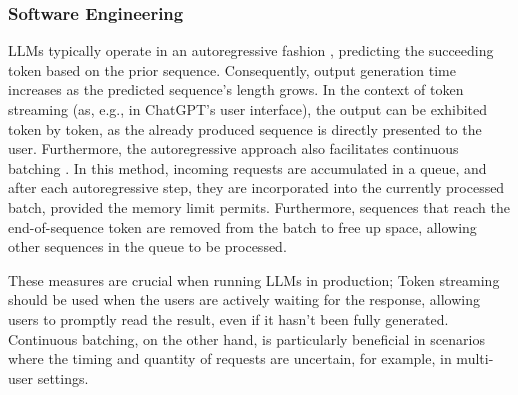 \documentclass[conference]{IEEEtran}
\begin{document}
\subsubsection{Software Engineering}
LLMs typically operate in an autoregressive fashion \cite{vaswani_attention_2017}, predicting the succeeding token based on the prior sequence. Consequently, output generation time increases as the predicted sequence's length grows. In the context of token streaming (as, e.g., in ChatGPT's user interface), the output can be exhibited token by token, as the already produced sequence is directly presented to the user. Furthermore, the autoregressive approach also facilitates continuous batching \cite{yu_orca_2022}. In this method, incoming requests are accumulated in a queue, and after each autoregressive step, they are incorporated into the currently processed batch, provided the memory limit permits. Furthermore, sequences that reach the end-of-sequence token are removed from the batch to free up space, allowing other sequences in the queue to be processed.

These measures are crucial when running LLMs in production; Token streaming should be used when the users are actively waiting for the response, allowing users to promptly read the result, even if it hasn't been fully generated. Continuous batching, on the other hand, is particularly beneficial in scenarios where the timing and quantity of requests are uncertain, for example, in multi-user settings. 

\end{document}

